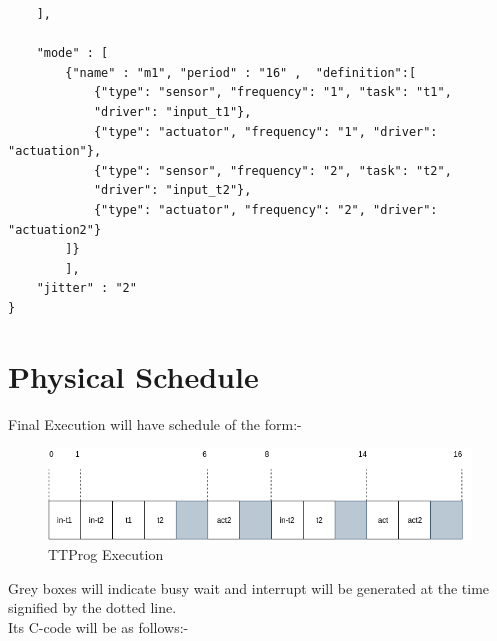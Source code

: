 \documentclass[16pt]{report}
\begin{document}
\begin{verbatim}
    ],

    "mode" : [
        {"name" : "m1", "period" : "16" ,  "definition":[
            {"type": "sensor", "frequency": "1", "task": "t1", 
            "driver": "input_t1"},
            {"type": "actuator", "frequency": "1", "driver": "actuation"},
            {"type": "sensor", "frequency": "2", "task": "t2", 
            "driver": "input_t2"},
            {"type": "actuator", "frequency": "2", "driver": "actuation2"}
        ]}
        ],
    "jitter" : "2"
}
\end{verbatim}


\section{Physical Schedule}

Final Execution will have schedule of the form:-
\begin{figure}[H]
\centering
\includegraphics[width=\linewidth ]{23scheduleEx.png}
\caption{TTProg Execution}
\end{figure}
Grey boxes will indicate busy wait and interrupt will be generated at the time signified by the dotted line.\\


Its C-code will be as follows:-
\end{document}
